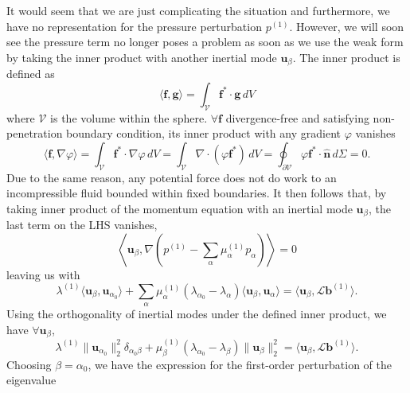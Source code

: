 %
It would seem that we are just complicating the situation and furthermore, we have no representation for the pressure perturbation $p^{(1)}$. However, we will soon see the pressure term no longer poses a problem as soon as we use the weak form by taking the inner product with another inertial mode $\mathbf{u}_{\beta}$. The inner product is defined as 
%
\begin{equation}
    \langle \mathbf{f}, \mathbf{g} \rangle = \int_\mathcal{V} \mathbf{f}^* \cdot \mathbf{g} \, dV
\end{equation}
%
where $\mathcal{V}$ is the volume within the sphere. $\forall \mathbf{f}$ divergence-free and satisfying non-penetration boundary condition, its inner product with any gradient $\varphi$ vanishes
%
\begin{equation}
    \langle \mathbf{f}, \nabla \varphi \rangle = \int_{\mathcal{V}} \mathbf{f}^*\cdot \nabla \varphi \, dV = \int_{\mathcal{V}} \nabla\cdot (\varphi \mathbf{f}^*) \, dV = \oint_{\partial \mathcal{V}} \varphi \mathbf{f}^* \cdot \hat{\mathbf{n}} \, d\Sigma = 0.
\end{equation}
%
Due to the same reason, any potential force does not do work to an incompressible fluid bounded within fixed boundaries. It then follows that, by taking inner product of the momentum equation with an inertial mode $\mathbf{u}_{\beta}$, the last term on the LHS vanishes,
%
\begin{equation}
    \left\langle \mathbf{u}_{\beta}, \nabla \left(p^{(1)} - \sum_\alpha \mu_\alpha^{(1)} p_\alpha \right) \right\rangle = 0
\end{equation}
%
leaving us with 
%
\begin{equation}
    \lambda^{(1)} \langle \mathbf{u}_{\beta}, \mathbf{u}_{\alpha_0} \rangle + \sum_\alpha \mu_\alpha^{(1)} \left(\lambda_{\alpha_0} - \lambda_{\alpha}\right) \langle \mathbf{u}_{\beta}, \mathbf{u}_\alpha \rangle = \langle \mathbf{u}_{\beta}, \mathcal{L} \mathbf{b}^{(1)} \rangle.
\end{equation}
%
Using the orthogonality of inertial modes under the defined inner product, we have $\forall \mathbf{u}_\beta$,
%
\begin{equation}
    \lambda^{(1)} \| \mathbf{u}_{\alpha_0} \|_2^2 \delta_{\alpha_0 \beta} + \mu_\beta^{(1)} \left(\lambda_{\alpha_0} - \lambda_{\beta}\right) \| \mathbf{u}_{\beta} \|_2^2 = \langle \mathbf{u}_{\beta}, \mathcal{L} \mathbf{b}^{(1)} \rangle.
\end{equation}
%
Choosing $\beta = \alpha_0$, we have the expression for the first-order perturbation of the eigenvalue

